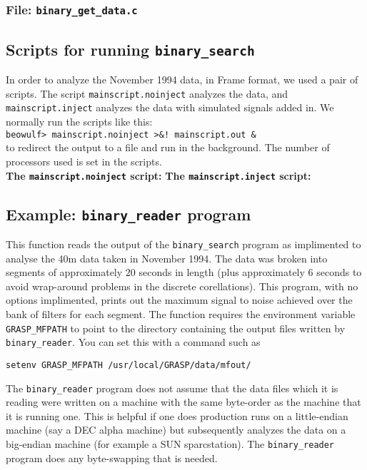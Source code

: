 \subsubsection{File: \texttt{binary\_get\_data.c}}
\clearpage

\subsection{Scripts for running {\tt binary\_search}}
In order to analyze the November 1994 data, in Frame format, we used
a pair of scripts.  The script {\tt mainscript.noinject} analyzes
the data, and {\tt mainscript.inject} analyzes the data with simulated
signals added in.
We normally run the scripts like this:\\
{\tt beowulf> mainscript.noinject >\&! mainscript.out \&}\\
to redirect the output to a file and run in the background.
The number of processors used is set in the scripts.\\
{\bf The {\tt mainscript.noinject} script:}
\noindent
{\bf The {\tt mainscript.inject} script:}

\subsection{Example: \texttt{binary\_reader} program}
\label{ss:binaryreader}
This function reads the output of the \texttt{binary\_search} program as
implimented to analyse the 40m data taken in November 1994.  The data
was broken into segments of approximately 20 seconds in length (plus
approximately 6 seconds to avoid wrap-around problems in the discrete
corellations).  This program, with no options implimented, prints
out the maximum signal to noise achieved over the bank of filters
for each segment.  The function requires the environment variable
\texttt{GRASP\_MFPATH} to point to the directory containing the output
files written by \texttt{binary\_reader}.  You can set this with a
command such as
\begin{verbatim}
setenv GRASP_MFPATH /usr/local/GRASP/data/mfout/
\end{verbatim}
The {\tt binary\_reader} program does not assume that the data files
which it is reading were written on a machine with the same byte-order
as the machine that it is running one.  This is helpful if one does
production runs on a little-endian machine (say a DEC alpha machine) but
subsequently analyzes the data on a big-endian machine (for example a SUN
sparcstation).  The {\tt binary\_reader} program does any byte-swapping
that is needed.

